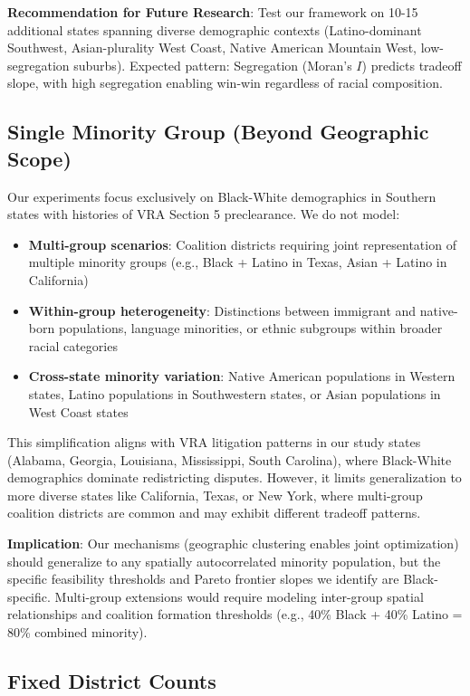 \textbf{Recommendation for Future Research}: Test our framework on 10-15 additional states spanning diverse demographic contexts (Latino-dominant Southwest, Asian-plurality West Coast, Native American Mountain West, low-segregation suburbs). Expected pattern: Segregation (Moran's $I$) predicts tradeoff slope, with high segregation enabling win-win regardless of racial composition.

\subsection{Single Minority Group (Beyond Geographic Scope)}

Our experiments focus exclusively on Black-White demographics in Southern states with histories of VRA Section 5 preclearance. We do not model:
\begin{itemize}
    \item \textbf{Multi-group scenarios}: Coalition districts requiring joint representation of multiple minority groups (e.g., Black + Latino in Texas, Asian + Latino in California)
    \item \textbf{Within-group heterogeneity}: Distinctions between immigrant and native-born populations, language minorities, or ethnic subgroups within broader racial categories
    \item \textbf{Cross-state minority variation}: Native American populations in Western states, Latino populations in Southwestern states, or Asian populations in West Coast states
\end{itemize}

This simplification aligns with VRA litigation patterns in our study states (Alabama, Georgia, Louisiana, Mississippi, South Carolina), where Black-White demographics dominate redistricting disputes. However, it limits generalization to more diverse states like California, Texas, or New York, where multi-group coalition districts are common and may exhibit different tradeoff patterns.

\textbf{Implication}: Our mechanisms (geographic clustering enables joint optimization) should generalize to any spatially autocorrelated minority population, but the specific feasibility thresholds and Pareto frontier slopes we identify are Black-specific. Multi-group extensions would require modeling inter-group spatial relationships and coalition formation thresholds (e.g., 40\% Black + 40\% Latino = 80\% combined minority).

\subsection{Fixed District Counts}

